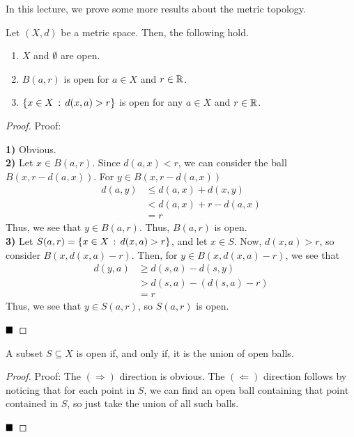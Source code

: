 In this lecture, we prove some more results about the metric topology.

\begin{lemma}
    Let $(X, d)$ be a metric space. Then, the following hold. 
    \begin{enumerate}
        \item $X$ and $\emptyset$ are open.
        \item $B(a, r)$ is open for $a \in X$ and $r \in \mathbb{R}$. 
        \item $\{x \in X \, :\, d(x, a) > r\}$ is open for any $a \in X$ and $r \in \mathbb{R}$. 
    \end{enumerate}
\end{lemma}
\begin{proof}{Proof:}
    
        \textbf{1)} Obvious.\\

        \textbf{2)} Let $x \in B(a, r)$. Since $d(a, x) < r$, we can consider the ball $B(x, r - d(a, x))$. For $y \in B(x, r - d(a, x))$
        \begin{align*}
            d(a, y) &\leq d(a, x) + d(x, y)\\
            &< d(a, x) + r - d(a, x)\\
            &= r
        \end{align*}
        Thus, we see that $y \in B(a, r)$. Thus, $B(a, r)$ is open.\\

        \textbf{3)} Let $S(a, r) = \{x \in X \, :\, d(x, a) > r\}$, and let $x \in S$. Now, $d(x, a) > r$, so consider $B(x, d(x, a) - r)$. Then, for $y \in B(x, d(x, a) - r)$, we see that
        \begin{align*}
			d(y, a) &\geq d(s, a) - d(s, y)\\
			&> d(s, a) - (d(s, a) - r)\\
			&= r
		\end{align*}
		Thus, we see that $y \in S(a, r)$, so $S(a, r)$ is open. 

		$\qed$
\end{proof}

\begin{lemma}
	A subset $S \subseteq X$ is open if, and only if, it is the union of open balls. 
\end{lemma}
\begin{proof}{Proof:}
	The $(\Rightarrow)$ direction is obvious. The $(\Leftarrow)$ direction follows by noticing that for each point in $S$, we can find an open ball containing that point contained in $S$, so just take the union of all such balls.

	$\qed$
\end{proof}

